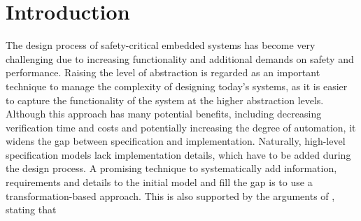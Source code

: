 \section{Introduction}
\label{sec:introduction} 


The design process of safety-critical embedded systems has become very challenging due to increasing functionality and additional demands on safety and performance.
Raising the level of abstraction is regarded as an important technique to manage the complexity of designing today's systems, as it is easier  to  capture  the functionality  of  the  system  at the  higher abstraction  levels. Although this approach has many potential  benefits,  including  decreasing  verification time and costs and  potentially increasing  the degree  of  automation,  it  widens the  gap  between specification and implementation. Naturally, high-level  specification  models  lack  implementation  details, which have to be added during the design process.
A  promising technique to systematically add information, requirements and details to the initial model and fill the gap is to use a transformation-based  approach. This is also supported by the arguments of \cite{kahng2009orion}, stating that 


